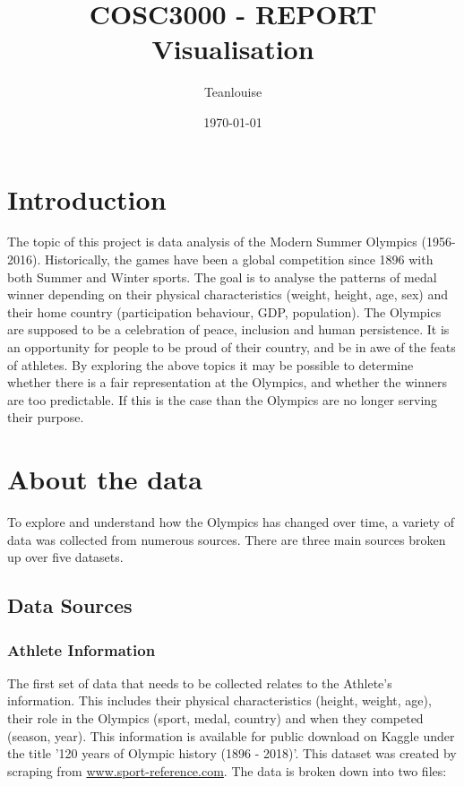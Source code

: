 \documentclass[a4 paper, 12pt]{article}
\title{COSC3000 - REPORT \\ Visualisation}
\author{Teanlouise}
\date{\today}
\begin{document}
\maketitle

\pagebreak
\tableofcontents

\pagebreak
\section{Introduction}
The topic of this project is data analysis of the Modern Summer Olympics (1956-2016). Historically, the games have been a global competition since 1896 with both Summer and Winter sports. The goal is to analyse the patterns of medal winner depending on their physical characteristics (weight, height, age, sex) and their home country (participation behaviour, GDP, population). The Olympics are supposed to be a celebration of peace, inclusion and human persistence. It is an opportunity for people to be proud of their country, and be in awe of the feats of athletes. By exploring the above topics it may be possible to determine whether there is a fair representation at the Olympics, and whether the winners are too predictable. If this is the case than the Olympics are no longer serving their purpose.

\section{About the data}
To explore and understand how the Olympics has changed over time, a variety of data was collected from numerous sources. There are three main sources broken up over five datasets. 

\subsection{Data Sources}

    \subsubsection{Athlete Information}
    The first set of data that needs to be collected relates to the Athlete's information. This includes their physical characteristics (height, weight, age), their role in the Olympics (sport, medal, country) and when they competed (season, year). This information is available for public download on Kaggle under the title '120 years of Olympic history (1896 - 2018)'. This dataset was created by scraping from \url{www.sport-reference.com}. The data is broken down into two files:
\end{document}
